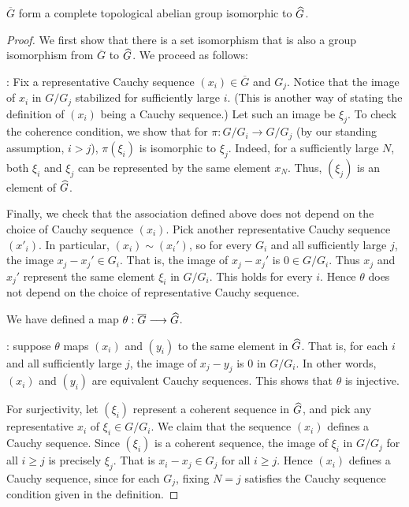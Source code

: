 \begin{prop}
$\overline{G}$ form a complete topological abelian group 
isomorphic to $\widehat{G}$.
\end{prop}
\begin{proof}
We first show that there is a set isomorphism that is also 
a group isomorphism from $\overline{G}$ to $\widehat{G}$. 
We proceed as follows:

 :
Fix a representative Cauchy sequence $(x_i) \in \overline{G}$ and 
$G_j$. Notice that the image of $x_i$ in $G/G_j$ stabilized for 
sufficiently large $i$. (This is another way of stating the 
definition of $(x_i)$ being a Cauchy sequence.) Let such an image 
be $\xi_j$. To check the coherence condition, we show that for 
$\pi: G/G_i \to G/G_j$ (by our standing assumption, $i > j$), 
$\pi(\xi_i)$ is isomorphic to $\xi_j$. Indeed, for a sufficiently 
large $N$, both $\xi_i$ and $\xi_j$ can be represented by the same 
element $x_N$. Thus, $(\xi_j)$ is an element of $\widehat{G}$.

Finally, we check that the association defined above does not 
depend on the choice of Cauchy sequence $(x_i)$. Pick another 
representative Cauchy sequence $(x'_i)$. In particular, $(x_i) 
\sim (x_i')$, so for every $G_i$ and all sufficiently large $j$, 
the image $x_j - x_j' \in G_i$. That is, the image of $x_j - x_j'$ 
is $0 \in G/G_i$. Thus $x_j$ and $x_j'$ represent the same element 
$\xi_i$ in $G/G_i$. This holds for every $i$. Hence $\theta$ does 
not depend on the choice of representative Cauchy sequence.

We have defined a map $\theta : \overline{G} \longrightarrow \widehat{G}$.

 : suppose $\theta$ maps $(x_i)$ and 
$(y_i)$ to the same element in $\widehat{G}$. That is, for each
$i$ and all sufficiently large $j$, the image of $x_j - y_j$ is 
$0$ in $G/G_i$. In other words, $(x_i)$ and $(y_i)$ are equivalent
Cauchy sequences. This shows that $\theta$ is injective.

For surjectivity, let $(\xi_i)$ represent a coherent sequence in
$\widehat{G}$, and pick any representative $x_i$ of $\xi_i \in
G/G_i$. We claim that the sequence $(x_i)$ defines a Cauchy
sequence. Since $(\xi_i)$ is a coherent sequence, the image of
$\xi_i$ in $G/G_j$ for all $i \geq j$ is precisely $\xi_j$. That 
is $x_i - x_j \in G_j$ for all $i \geq j$. Hence $(x_i)$ defines
a Cauchy sequence, since for each $G_j$, fixing $N = j$ satisfies
the Cauchy sequence condition given in the definition.


\end{proof}
